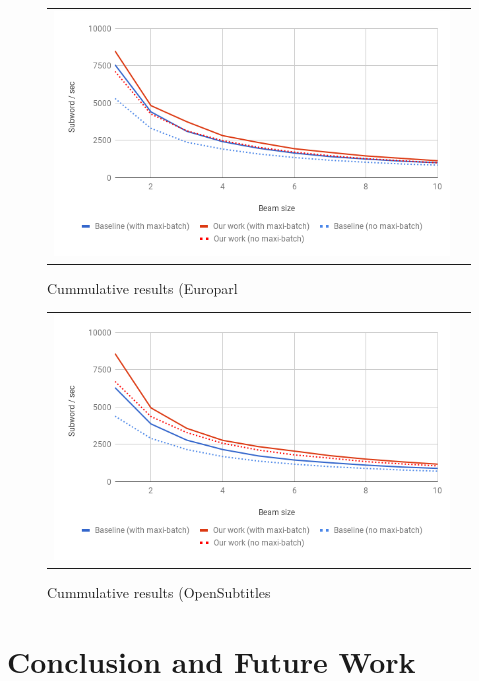 \documentclass[11pt,a4paper]{article}
\begin{document}
\begin{figure}
\centering
\begin{tabular}{cc}
{\includegraphics[scale=0.3]{cummulative-europarl.png}} 
\end{tabular}
\caption{Cummulative results (Europarl}
\label{fig:cummulative-europarl}
\end{figure} 

\begin{figure}
\centering
\begin{tabular}{cc}
{\includegraphics[scale=0.3]{cummulative-opensubtitles.png}} 
\end{tabular}
\caption{Cummulative results (OpenSubtitles}
\label{fig:cummulative-opensubtitles}
\end{figure} 

\section{Conclusion and Future Work}
\end{document}

